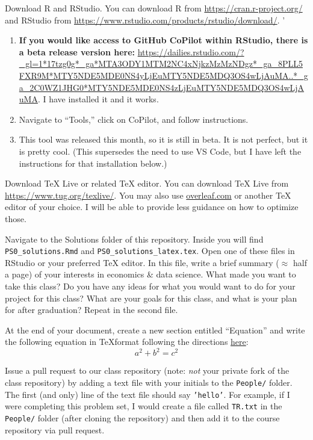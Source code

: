 \documentclass[12pt,english]{exam}
\begin{document}
\begin{questions}
\question Download R and RStudio. You can download R from \url{https://cran.r-project.org/} and RStudio from \url{https://www.rstudio.com/products/rstudio/download/}. '

\begin{enumerate}
  \item \textbf{If you would like access to GitHub CoPilot within RStudio, there is a beta release version here:} \url{https://dailies.rstudio.com/?_gl=1*17tzg0g*_ga*MTA3ODY1MTM2NC4xNjkzMzMzNDgz*_ga_8PLL5FXR9M*MTY5NDE5MDE0NS4yLjEuMTY5NDE5MDQ3OS4wLjAuMA..*_ga_2C0WZ1JHG0*MTY5NDE5MDE0NS4zLjEuMTY5NDE5MDQ3OS4wLjAuMA}. I have installed it and it works. 
  \item Navigate to ``Tools,'' click on CoPilot, and follow instructions. 
  \item This tool was released this month, so it is still in beta. It is not perfect, but it is pretty cool. (This supersedes the need to use VS Code, but I have left the instructions for that installation below.)
\end{enumerate}

\question Download TeX Live or related TeX editor. You can download TeX Live from \url{https://www.tug.org/texlive/}. You may also use \url{overleaf.com} or another TeX editor of your choice. I will be able to provide less guidance on how to optimize those.

\question Navigate to the Solutions folder of this repository. Inside you will find \texttt{PS0\_solutions.Rmd} and \texttt{PS0\_solutions\_latex.tex}. Open one of these files in RStudio or your preferred TeX editor. In this file, write a brief summary ($\approx$ half a page) of your interests in economics \& data science. What made you want to take this class? Do you have any ideas for what you would want to do for your project for this class? What are your goals for this class, and what is your plan for after graduation? Repeat in the second file. 

\question At the end of your document, create a new section entitled ``Equation'' and write the following equation in \TeX format following the directions \href{https://www.overleaf.com/learn/latex/mathematical_expressions}{here}:
\begin{equation}
	a^{2} + b^{2} = c^{2}
\end{equation}

\question Issue a pull request to our class repository (note: \emph{not} your private fork of the class repository) by adding a text file with your initials to the \texttt{People/} folder. The first (and only) line of the text file should say \texttt{'hello'}. For example, if I were completing this problem set, I would create a file called \texttt{TR.txt} in the \texttt{People/} folder (after cloning the repository) and then add it to the course repository via pull request.

\end{questions}
\end{document}
